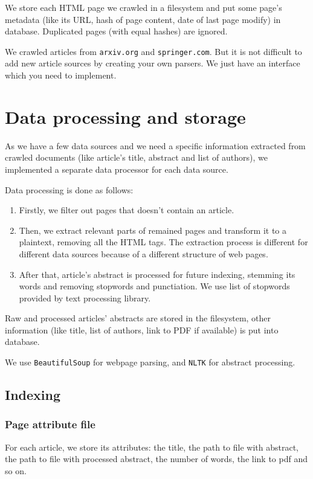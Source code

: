 We store each HTML page we crawled in a filesystem and put some page's metadata 
(like its URL, hash of page content, date of last page modify) in database. Duplicated pages (with equal hashes) are ignored.

We crawled articles from \texttt{arxiv.org} and \texttt{springer.com}. But it is not difficult to add new article sources by creating your own parsers. We just have an interface which you need to implement.

\newpage

\section{Data processing and storage}

As we have a few data sources and we need a specific information extracted from crawled documents
(like article's title, abstract and list of authors), we implemented a separate data processor for each data source.

Data processing is done as follows:
\begin{enumerate}

\item Firstly, we filter out pages that doesn't contain an article.

\item Then, we extract relevant parts of remained pages and transform it to a plaintext, removing all the HTML tags. 
    The extraction process is different for different data sources because of a different structure of web pages.

\item After that, article's abstract is processed for future indexing, stemming its words and removing stopwords and punctiation.
    We use list of stopwords provided by text processing library.


\end{enumerate}

Raw and processed articles' abstracts are stored in the filesystem,
other information (like title, list of authors, link to PDF if available) is put into database.

We use \texttt{BeautifulSoup} for webpage parsing, and \texttt{NLTK} for abstract processing.

\subsection{Indexing}
\subsubsection{Page attribute file}
For each article, we store its attributes: the title, the path to file with abstract, the path to file with processed abstract, the number of words, the link to pdf and so on.

